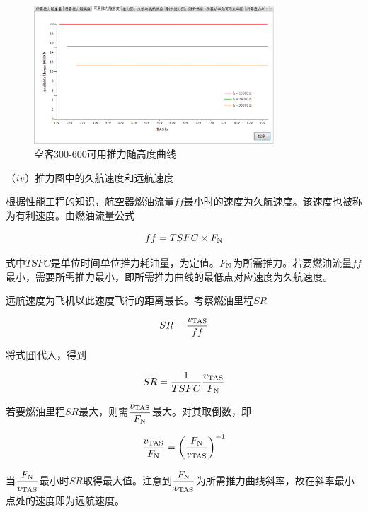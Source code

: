 \documentclass[a4paper,punct,space,heading=true,AutoFakeBold]{ctexrep}
\begin{document}
\begin{figure}[h]
	\centering
	\includegraphics[width=0.8\textwidth]{pic/Fawithh.eps}\hspace{30pt}
	\caption{空客300-600可用推力随高度曲线}\label{Fawithh}
\end{figure}




（$\romannumeral4$）推力图中的久航速度和远航速度

根据性能工程的知识，航空器燃油流量$ff$最小时的速度为久航速度。该速度也被称为有利速度。由燃油流量公式

\begin{equation}\label{ff}
ff=TSFC\times F_{\rm N}
\end{equation}

式中$TSFC$是单位时间单位推力耗油量，为定值。$F_{\rm N}$为所需推力。若要燃油流量$ff$最小，需要所需推力最小，即所需推力曲线的最低点对应速度为久航速度。

远航速度为飞机以此速度飞行的距离最长。考察燃油里程$SR$

\begin{equation}\label{SRequ}
SR=\frac{v_{\rm TAS}}{ff}
\end{equation}

将式\ref{ff}代入，得到

\begin{equation}
SR=\frac{1}{TSFC}\frac{v_{\rm TAS}}{F_{\rm N}}
\end{equation}

若要燃油里程$SR$最大，则需$\displaystyle{\frac{v_{\rm TAS}}{F_{\rm N}}}$最大。对其取倒数，即

\begin{equation}
\frac{v_{\rm TAS}}{F_{\rm N}}=\left(\frac{F_{\rm N}}{v_{\rm TAS}}\right)^{-1}
\end{equation}

当$\displaystyle{\frac{F_{\rm N}}{v_{\rm TAS}}}$最小时$SR$取得最大值。注意到$\displaystyle{\frac{F_{\rm N}}{v_{\rm TAS}}}$为所需推力曲线斜率，故在斜率最小点处的速度即为远航速度。
\end{document}
